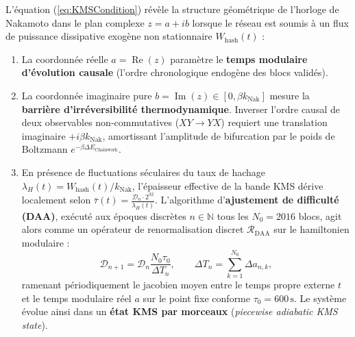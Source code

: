 \documentclass[10pt,twocolumn,a4paper]{article}
\theoremstyle{plain}
\theoremstyle{definition}
\theoremstyle{remark}
\newcommand{\kNak}{k_{\text{Nak}}}
\begin{document}
L'équation (\ref{eq:KMSCondition}) révèle la structure géométrique de l'horloge de Nakamoto dans le plan complexe $z = a + ib$ lorsque le réseau est soumis à un flux de puissance dissipative exogène non stationnaire $W_{\text{hash}}(t)$ :
\begin{enumerate}
    \item La coordonnée réelle $a = \operatorname{Re}(z)$ paramètre le \textbf{temps modulaire d'évolution causale} (l'ordre chronologique endogène des blocs validés).
    \item La coordonnée imaginaire pure $b = \operatorname{Im}(z) \in [0, \beta\kNak]$ mesure la \textbf{barrière d'irréversibilité thermodynamique}. Inverser l'ordre causal de deux observables non-commutatives ($XY \to YX$) requiert une translation imaginaire $+i\beta\kNak$, amortissant l'amplitude de bifurcation par le poids de Boltzmann $e^{-\beta \Delta E_{\text{Chainwork}}}$.
    \item En présence de fluctuations séculaires du taux de hachage $\lambda_H(t) = W_{\text{hash}}(t)/\kNak$, l'épaisseur effective de la bande KMS dérive localement selon $\bar{\tau}(t) = \frac{\mathcal{D}_n \cdot 2^{32}}{\lambda_H(t)}$. L'algorithme d'\textbf{ajustement de difficulté (DAA)}, exécuté aux époques discrètes $n \in \mathbb{N}$ tous les $N_0 = 2016$ blocs, agit alors comme un opérateur de renormalisation discret $\mathcal{R}_{\text{DAA}}$ sur le hamiltonien modulaire :
    \begin{equation}
        \mathcal{D}_{n+1} = \mathcal{D}_n \frac{N_0 \tau_0}{\Delta T_n}, \qquad \Delta T_n = \sum_{k=1}^{N_0} \Delta a_{n,k},
        \label{eq:DifficultyRenormalization}
    \end{equation}
    ramenant périodiquement le jacobien moyen entre le temps propre externe $t$ et le temps modulaire réel $a$ sur le point fixe conforme $\tau_0 = 600\,\text{s}$. Le système évolue ainsi dans un \textbf{état KMS par morceaux} (\textit{piecewise adiabatic KMS state}).
\end{enumerate}
\end{document}
